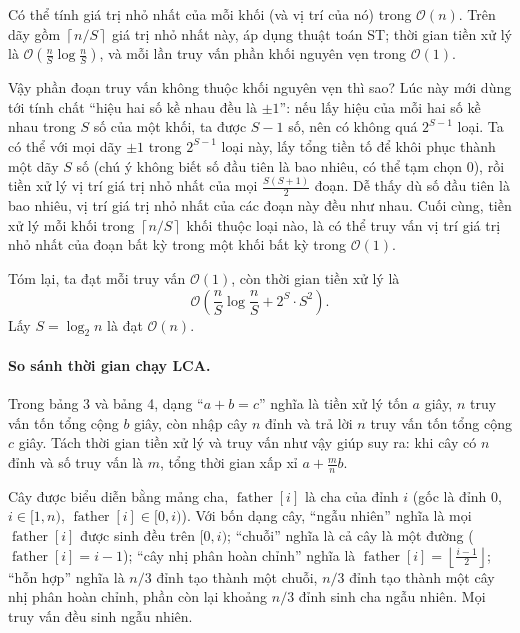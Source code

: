\documentclass[11pt]{article}
\newcommand{\Oh}{\mathcal{O}}
\begin{document}
Có thể tính giá trị nhỏ nhất của mỗi khối (và vị trí của nó) trong \(\Oh(n)\).
Trên dãy gồm \(\left\lceil n/S\right\rceil\) giá trị nhỏ nhất này, áp dụng
thuật toán ST; thời gian tiền xử lý là
\(\Oh\left(\frac nS\log\frac nS\right)\), và mỗi lần truy vấn phần khối nguyên
vẹn trong \(\Oh(1)\).

Vậy phần đoạn truy vấn không thuộc khối nguyên vẹn thì sao? Lúc này mới dùng
tới tính chất ``hiệu hai số kề nhau đều là \(\pm1\)'': nếu lấy hiệu của mỗi
hai số kề nhau trong \(S\) số của một khối, ta được \(S-1\) số, nên có không
quá \(2^{S-1}\) loại. Ta có thể với mọi dãy \(\pm1\) trong \(2^{S-1}\) loại
này, lấy tổng tiền tố để khôi phục thành một dãy \(S\) số (chú ý không biết số
đầu tiên là bao nhiêu, có thể tạm chọn 0), rồi tiền xử lý vị trí giá trị nhỏ
nhất của mọi \(\frac{S(S+1)}2\) đoạn. Dễ thấy dù số đầu tiên là bao nhiêu, vị
trí giá trị nhỏ nhất của các đoạn này đều như nhau. Cuối cùng, tiền xử lý mỗi
khối trong \(\left\lceil n/S\right\rceil\) khối thuộc loại nào, là có thể
truy vấn vị trí giá trị nhỏ nhất của đoạn bất kỳ trong một khối bất kỳ trong
\(\Oh(1)\).

Tóm lại, ta đạt mỗi truy vấn \(\Oh(1)\), còn thời gian tiền xử lý là
\[
  \Oh\left(\frac nS\log\frac nS+2^S\cdot S^2\right).
\]
Lấy \(S=\log_2 n\) là đạt \(\Oh(n)\).

\paragraph{So sánh thời gian chạy LCA.}
Trong bảng 3 và bảng 4, dạng ``\(a+b=c\)'' nghĩa là tiền xử lý tốn \(a\) giây,
\(n\) truy vấn tốn tổng cộng \(b\) giây, còn nhập cây \(n\) đỉnh và trả lời
\(n\) truy vấn tốn tổng cộng \(c\) giây. Tách thời gian tiền xử lý và truy vấn
như vậy giúp suy ra: khi cây có \(n\) đỉnh và số truy vấn là \(m\), tổng thời
gian xấp xỉ \(a+\frac mn b\).

Cây được biểu diễn bằng mảng cha, \(\operatorname{father}[i]\) là cha của đỉnh
\(i\) (gốc là đỉnh \(0\), \(i\in[1,n)\),
\(\operatorname{father}[i]\in[0,i)\)). Với bốn dạng cây, ``ngẫu nhiên'' nghĩa
là mọi \(\operatorname{father}[i]\) được sinh đều trên \([0,i)\); ``chuỗi''
nghĩa là cả cây là một đường (\(\operatorname{father}[i]=i-1\)); ``cây nhị
phân hoàn chỉnh'' nghĩa là
\(\operatorname{father}[i]=\left\lfloor\frac{i-1}{2}\right\rfloor\); ``hỗn
hợp'' nghĩa là \(n/3\) đỉnh tạo thành một chuỗi, \(n/3\) đỉnh tạo thành một
cây nhị phân hoàn chỉnh, phần còn lại khoảng \(n/3\) đỉnh sinh cha ngẫu nhiên.
Mọi truy vấn đều sinh ngẫu nhiên.
\end{document}
